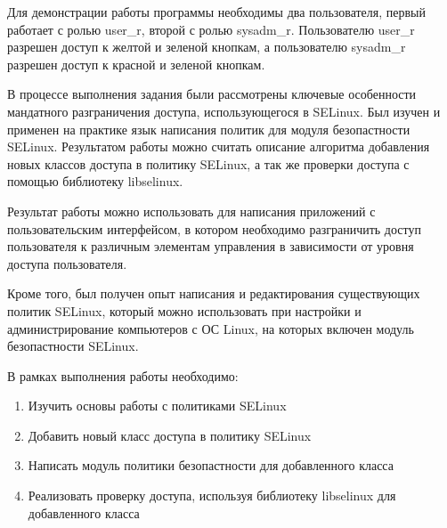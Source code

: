 \documentclass{./../class/UIR}
\begin{document}
	Для демонстрации работы программы необходимы два пользователя, первый работает
	с ролью user\_r, второй с ролью sysadm\_r. Пользователю user\_r разрешен доступ
	к желтой и зеленой кнопкам, а пользователю sysadm\_r разрешен доступ к красной
	и зеленой кнопкам. 
	
	
 В процессе выполнения задания были рассмотрены ключевые особенности мандатного
 разграничения доступа, использующегося в SELinux. Был изучен и применен на
 практике язык написания политик для модуля безопастности SELinux. Результатом
 работы можно считать описание алгоритма добавления новых классов доступа в
 политику SELinux, а так же проверки доступа с помощью библиотеку libselinux. 
 
 Результат работы можно использовать для написания приложений с пользовательским
 интерфейсом, в котором необходимо разграничить доступ пользователя к различным
 элементам управления в зависимости от уровня доступа пользователя.
 
 Кроме того, был получен опыт написания и редактирования существующих политик
 SELinux, который можно использовать при настройки и администрирование
 компьютеров с ОС Linux, на которых включен модуль безопастности SELinux.
 
\ReviewOfSupervisorTemplate

\begin{ReviewOfSupervisor}

\end{ReviewOfSupervisor}

\TaskOfStudentTemplate

\begin{TaskOfStudent}
В рамках выполнения работы необходимо: 
\begin{enumerate}
  \item Изучить основы работы с политиками SELinux
  \item Добавить новый класс доступа в политику SELinux
  \item Написать модуль политики безопастности для добавленного класса
  \item Реализовать проверку доступа, используя библиотеку libselinux для
  добавленного класса
\end{enumerate}
\end{TaskOfStudent}
\end{document}
